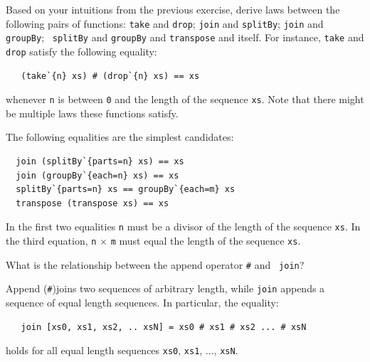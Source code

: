 \begin{Exercise}\label{ex:seq:12}
  Based on your intuitions from the previous exercise, derive laws
  between the following pairs of functions: {\tt take} and {\tt drop};
  {\tt join} and {\tt splitBy}; {\tt join} and {\tt groupBy}; {\tt
    splitBy} and {\tt groupBy} and {\tt transpose} and itself.  For
  instance, {\tt take} and {\tt drop} satisfy the following
  equality:\indTake\indDrop\indJoin\indSplitBy\indGroup\indTranspose
\begin{Verbatim}
   (take`{n} xs) # (drop`{n} xs) == xs
\end{Verbatim}
whenever {\tt n} is between {\tt 0} and the length of the sequence
{\tt xs}. Note that there might be multiple laws these functions
satisfy.
\end{Exercise}
\begin{Answer}
  The following equalities are the simplest
  candidates:\indJoin\indSplitBy\indGroup\indTranspose
\begin{Verbatim}
  join (splitBy`{parts=n} xs) == xs
  join (groupBy`{each=n} xs) == xs
  splitBy`{parts=n} xs == groupBy`{each=m} xs
  transpose (transpose xs) == xs
\end{Verbatim}
In the first two equalities {\tt n} must be a divisor of the length of
the sequence {\tt xs}.  In the third equation, {\tt n} $\times$ {\tt m}
must equal the length of the sequence {\tt xs}.
\end{Answer}

\begin{Exercise}\label{ex:seq:13}
What is the relationship between the append operator {\tt \#} and {\tt
  join}?\indAppend\indJoin
\end{Exercise}
\begin{Answer}
Append ({\tt \#})\indAppend\indJoin joins two sequences of arbitrary
length, while {\tt join} appends a sequence of equal length
sequences. In particular, the equality:
\begin{Verbatim}
   join [xs0, xs1, xs2, .. xsN] = xs0 # xs1 # xs2 ... # xsN
\end{Verbatim}
holds for all equal length sequences {\tt xs0}, {\tt xs1}, $\ldots$,
{\tt xsN}.
\end{Answer}

